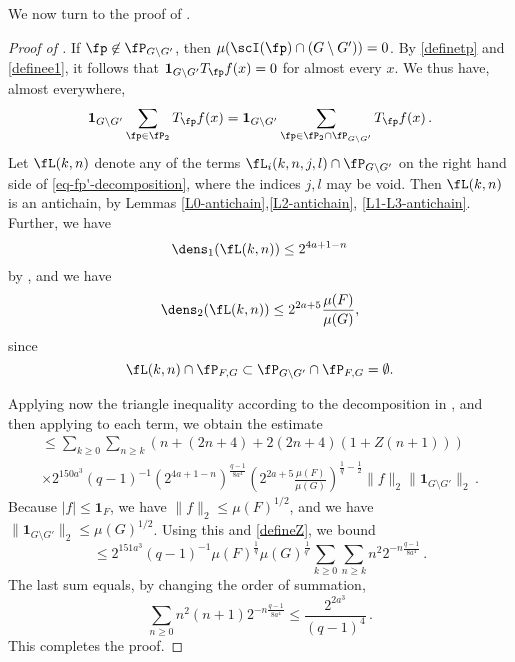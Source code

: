 We now turn to the proof of .
\begin{proof}[Proof of ]
    \leanok
    If $\fp \not\in \fP_{G \setminus G'}$, then $\mu(\scI(\fp) \cap (G \setminus G')) = 0$. By \eqref{definetp} and \eqref{definee1}, it follows that
    $\mathbf{1}_{G \setminus G'} T_{\fp}f(x) = 0$ for almost every $x$. We thus have, almost everywhere,
    $$
        \mathbf{1}_{G\setminus G'} \sum_{\fp \in \fP_2} T_{\fp}f(x) = \mathbf{1}_{G\setminus G'} \sum_{\fp \in \fP_2 \cap \fP_{G \setminus G'}} T_{\fp}f(x)\,.
    $$
    Let $\fL(k,n)$ denote any of the terms $\fL_i(k,n,j,l) \cap \fP_{G \setminus G'}$ on the right hand side of \eqref{eq-fp'-decomposition}, where the indices $j, l$ may be void. Then $\fL(k,n)$ is an antichain, by Lemmas \ref{L0-antichain},\ref{L2-antichain}, \ref{L1-L3-antichain}. Further, we have
    \begin{equation*}
    \dens_1(\fL(k,n)) \le 2^{4a+1 - n}
    \end{equation*}
    by , and we have
    \begin{equation*}
     \dens_2(\fL(k,n)) \le 2^{2a+5} \frac{\mu(F)}{\mu(G)},
     \end{equation*}
     since
     \begin{equation*}
     \fL(k,n) \cap \fP_{F,G} \subset \fP_{G \setminus G'} \cap \fP_{F, G} = \emptyset.
     \end{equation*}

    Applying now the triangle inequality according to the decomposition in , and then applying  to each term, we obtain the estimate
    \begin{multline*}
        \le \sum_{k \ge 0} \sum_{n \ge k} (n + (2n+4) + 2(2n+4) (1+Z(n+1))) \\
        \times 2^{150a^3}(q-1)^{-1} (2^{4a+1-n})^{\frac{q-1}{8a^4}} (2^{2a+5} \frac{\mu(F)}{\mu(G)})^{\frac{1}{q} - \frac{1}{2}} \|f\|_2\|\mathbf{1}_{G\setminus G'}\|_2\,.
    \end{multline*}
    Because $|f| \le \mathbf{1}_F$, we have $\|f\|_2 \le \mu(F)^{1/2}$, and we have $\|\mathbf{1}_{G\setminus G'}\|_2 \le \mu(G)^{1/2}$. Using this and \eqref{defineZ}, we bound
    $$
        \le 2^{151a^3} (q - 1)^{-1} \mu(F)^{\frac{1}{q}} \mu(G)^{\frac{1}{q'}} \sum_{k \ge 0} \sum_{n \ge k} n^2 2^{-n\frac{q-1}{8a^4}}\,.
    $$
    The last sum equals, by changing the order of summation,
    $$
        \sum_{n \ge 0} n^2(n+1) 2^{-n\frac{q-1}{8a^4}} \le \frac{2^{2a^3}}{(q-1)^4}\,.
    $$
    This completes the proof.
\end{proof}

